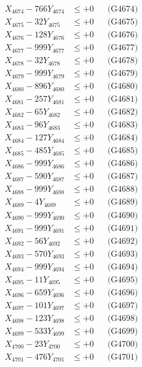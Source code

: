 \documentclass[a4paper,10pt]{article}
\begin{document}
{\begin{align}
X_{4674} - 766Y_{4674} &\leq +0 && \text{(G4674)} \\
X_{4675} - 32Y_{4675} &\leq +0 && \text{(G4675)} \\
X_{4676} - 128Y_{4676} &\leq +0 && \text{(G4676)} \\
X_{4677} - 999Y_{4677} &\leq +0 && \text{(G4677)} \\
X_{4678} - 32Y_{4678} &\leq +0 && \text{(G4678)} \\
X_{4679} - 999Y_{4679} &\leq +0 && \text{(G4679)} \\
X_{4680} - 896Y_{4680} &\leq +0 && \text{(G4680)} \\
\allowbreak
X_{4681} - 257Y_{4681} &\leq +0 && \text{(G4681)} \\
X_{4682} - 65Y_{4682} &\leq +0 && \text{(G4682)} \\
X_{4683} - 96Y_{4683} &\leq +0 && \text{(G4683)} \\
X_{4684} - 127Y_{4684} &\leq +0 && \text{(G4684)} \\
X_{4685} - 485Y_{4685} &\leq +0 && \text{(G4685)} \\
X_{4686} - 999Y_{4686} &\leq +0 && \text{(G4686)} \\
X_{4687} - 590Y_{4687} &\leq +0 && \text{(G4687)} \\
X_{4688} - 999Y_{4688} &\leq +0 && \text{(G4688)} \\
X_{4689} - 4Y_{4689} &\leq +0 && \text{(G4689)} \\
X_{4690} - 999Y_{4690} &\leq +0 && \text{(G4690)} \\
\allowbreak
X_{4691} - 999Y_{4691} &\leq +0 && \text{(G4691)} \\
X_{4692} - 56Y_{4692} &\leq +0 && \text{(G4692)} \\
X_{4693} - 570Y_{4693} &\leq +0 && \text{(G4693)} \\
X_{4694} - 999Y_{4694} &\leq +0 && \text{(G4694)} \\
X_{4695} - 11Y_{4695} &\leq +0 && \text{(G4695)} \\
X_{4696} - 659Y_{4696} &\leq +0 && \text{(G4696)} \\
X_{4697} - 101Y_{4697} &\leq +0 && \text{(G4697)} \\
X_{4698} - 123Y_{4698} &\leq +0 && \text{(G4698)} \\
X_{4699} - 533Y_{4699} &\leq +0 && \text{(G4699)} \\
X_{4700} - 23Y_{4700} &\leq +0 && \text{(G4700)} \\
\allowbreak
X_{4701} - 476Y_{4701} &\leq +0 && \text{(G4701)} \\

\end{align}}
\end{document}
